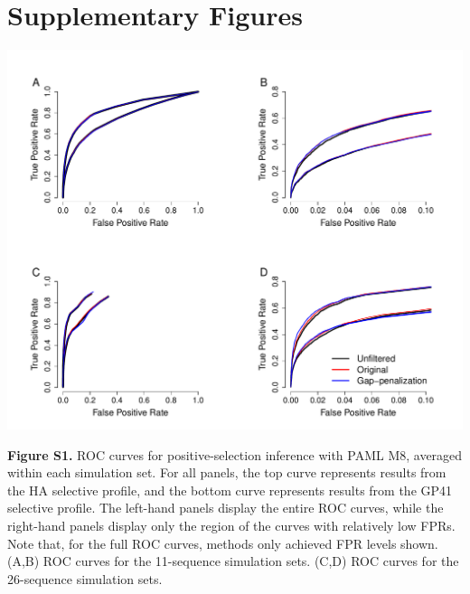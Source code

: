 \documentclass[11pt]{article}
\begin{document}
\newpage
\section{Supplementary Figures}


\centerline{\includegraphics[width=6.5in]{Figures/ROC_SI_paml.pdf}}
\noindent \textbf{Figure S1.} ROC curves for positive-selection inference with PAML M8, averaged within each simulation set. For all panels, the top curve represents results from the HA selective profile, and the bottom curve represents results from the GP41 selective profile. The left-hand panels display the entire ROC curves, while the right-hand panels display only the region of the curves with relatively low FPRs. Note that, for the full ROC curves, methods only achieved FPR levels shown. (A,B) ROC curves for the 11-sequence simulation sets. (C,D) ROC curves for the 26-sequence simulation sets.
\end{document}
